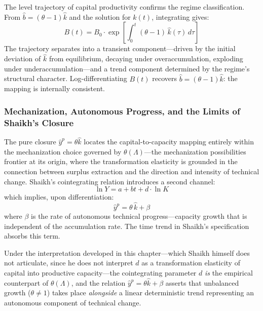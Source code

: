 The level trajectory of capital productivity confirms the regime classification. From $\hat{b} = (\theta - 1)\hat{k}$ and the solution for $\hat{k}(t)$, integrating gives:
%
\begin{equation}\label{eq:B_trajectory}
	B(t) = B_0 \cdot \exp\left[\int_0^t (\theta - 1)\,\hat{k}(\tau)\,d\tau\right]
\end{equation}
%
The trajectory separates into a transient component---driven by the initial deviation of $\hat{k}$ from equilibrium, decaying under overaccumulation, exploding under underaccumulation---and a trend component determined by the regime's structural character. Log-differentiating $B(t)$ recovers $\hat{b} = (\theta - 1)\hat{k}$: the mapping is internally consistent.



\subsubsection{Mechanization, Autonomous Progress, and the Limits of Shaikh's Closure}
\label{sec:extended_closure}

The pure closure $\hat{y}^p = \theta\hat{k}$ locates the capital-to-capacity mapping entirely within the mechanization choice governed by $\theta(\Lambda)$---the mechanization possibilities frontier at its origin, where the transformation elasticity is grounded in the connection between surplus extraction and the direction and intensity of technical change. Shaikh's cointegrating relation introduces a second channel:
%
\begin{equation}\label{eq:shaikh_coint}
	\ln Y = a + bt + d \cdot \ln K
\end{equation}
%
which implies, upon differentiation:
%
\begin{equation}\label{eq:extended_closure}
	\hat{y}^p = \theta\,\hat{k} + \beta
\end{equation}
%
where $\beta$ is the rate of autonomous technical progress---capacity growth that is independent of the accumulation rate. The time trend in Shaikh's specification absorbs this term.

Under the interpretation developed in this chapter---which Shaikh himself does not articulate, since he does not interpret $d$ as a transformation elasticity of capital into productive capacity---the cointegrating parameter $d$ \emph{is} the empirical counterpart of $\theta(\Lambda)$, and the relation $\hat{y}^p = \theta\hat{k} + \beta$ asserts that unbalanced growth ($\theta \neq 1$) takes place \emph{alongside} a linear deterministic trend representing an autonomous component of technical change.

